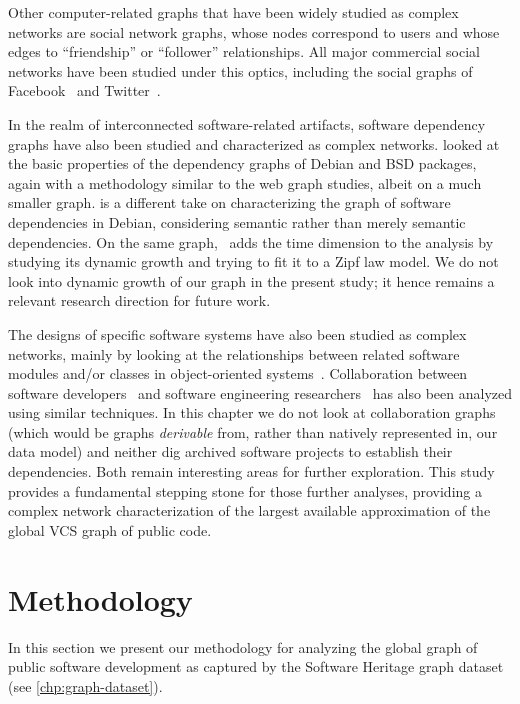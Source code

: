 Other computer-related graphs that have been widely studied as complex networks
are social network graphs, whose nodes correspond to users and whose edges to
``friendship'' or ``follower'' relationships. All major commercial social
networks have been studied under this optics, including the social graphs of
Facebook~\cite{ugander2011facebook} and Twitter~\cite{kwak2010twitter}.

In the realm of interconnected software-related artifacts, software dependency
graphs have also been studied and characterized as complex networks.
\cite{labelle2004inter} looked at the basic properties of the dependency graphs
of Debian and BSD packages, again with a methodology similar to the web graph
studies, albeit on a much smaller graph. \cite{abate2009strong} is a different
take on characterizing the graph of software dependencies in Debian,
considering semantic rather than merely semantic dependencies. On the same
graph,~\cite{maillart2008empirical} adds the time dimension to the analysis by
studying its dynamic growth and trying to fit it to a Zipf law model. We do not
look into dynamic growth of our graph in the present study; it hence remains
a relevant research direction for future work.

The designs of specific software systems have also been studied as complex
networks, mainly by looking at the relationships between related software
modules and/or classes in object-oriented systems~\cite{myers2003software,
  valverde2003hierarchical, wen2007javanetwork}.  Collaboration between
software developers~\cite{singh2010smallworldcollab} and software engineering
researchers~\cite{hassan2004revengsmallworld} has also been analyzed using
similar techniques. In this chapter we do not look at collaboration graphs (which
would be graphs \emph{derivable} from, rather than natively represented in, our
data model) and neither dig archived software projects to establish their
dependencies. Both remain interesting areas for further exploration. This
study provides a fundamental stepping stone for those further analyses,
providing a complex network characterization of the largest available
approximation of the global VCS graph of public code.


\section{Methodology}
\label{sec:topology-methodology}

In this section we present our methodology for analyzing the global graph of
public software development as captured by the Software Heritage graph dataset
(see \cref{chp:graph-dataset}).

